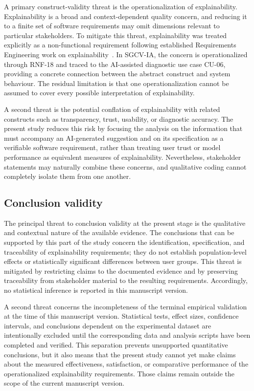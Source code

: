 \documentclass[pdflatex,sn-mathphys-num,Numbered]{sn-jnl}
\begin{document}
A primary construct-validity threat is the operationalization of explainability. Explainability is a broad and context-dependent quality concern, and reducing it to a finite set of software requirements may omit dimensions relevant to particular stakeholders. To mitigate this threat, explainability was treated explicitly as a non-functional requirement following established Requirements Engineering work on explainability~\cite{chazette2020,chazette2021,chazette2022}. In SGCV-IA, the concern is operationalized through RNF-18 and traced to the AI-assisted diagnostic use case CU-06, providing a concrete connection between the abstract construct and system behaviour. The residual limitation is that one operationalization cannot be assumed to cover every possible interpretation of explainability.

A second threat is the potential conflation of explainability with related constructs such as transparency, trust, usability, or diagnostic accuracy. The present study reduces this risk by focusing the analysis on the information that must accompany an AI-generated suggestion and on its specification as a verifiable software requirement, rather than treating user trust or model performance as equivalent measures of explainability. Nevertheless, stakeholder statements may naturally combine these concerns, and qualitative coding cannot completely isolate them from one another.

\subsection{Conclusion validity}\label{tv:conclusion}

The principal threat to conclusion validity at the present stage is the qualitative and contextual nature of the available evidence. The conclusions that can be supported by this part of the study concern the identification, specification, and traceability of explainability requirements; they do not establish population-level effects or statistically significant differences between user groups. This threat is mitigated by restricting claims to the documented evidence and by preserving traceability from stakeholder material to the resulting requirements. Accordingly, no statistical inference is reported in this manuscript version.

A second threat concerns the incompleteness of the terminal empirical validation at the time of this manuscript version. Statistical tests, effect sizes, confidence intervals, and conclusions dependent on the experimental dataset are intentionally excluded until the corresponding data and analysis scripts have been completed and verified. This separation prevents unsupported quantitative conclusions, but it also means that the present study cannot yet make claims about the measured effectiveness, satisfaction, or comparative performance of the operationalized explainability requirements. Those claims remain outside the scope of the current manuscript version.
\end{document}
